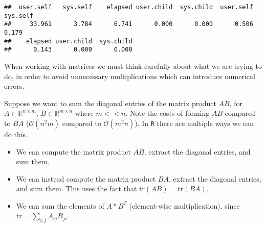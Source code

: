 \documentclass[]{article}
\newenvironment{Shaded}{\begin{snugshade}}{\end{snugshade}}
\newcommand{\CommentTok}[1]{\textcolor[rgb]{0.56,0.35,0.01}{\textit{#1}}}
\newcommand{\DecValTok}[1]{\textcolor[rgb]{0.00,0.00,0.81}{#1}}
\newcommand{\KeywordTok}[1]{\textcolor[rgb]{0.13,0.29,0.53}{\textbf{#1}}}
\newcommand{\NormalTok}[1]{#1}
\newcommand{\OperatorTok}[1]{\textcolor[rgb]{0.81,0.36,0.00}{\textbf{#1}}}
\newcommand{\StringTok}[1]{\textcolor[rgb]{0.31,0.60,0.02}{#1}}
\begin{document}
\begin{verbatim}
##  user.self   sys.self    elapsed user.child  sys.child  user.self   sys.self 
##     33.961      3.784      6.741      0.000      0.000      0.506      0.179 
##    elapsed user.child  sys.child 
##      0.143      0.000      0.000
\end{verbatim}

When working with matrices we must think carefully about what we are
trying to do, in order to avoid unnecessary multiplications which can
introduce numerical errors.

Suppose we want to sum the diagonal entries of the matrix product
\(AB\), for \(A \in \mathbb{R}^{n \times m}\),
\(B \in \mathbb{R}^{m \times n}\) where \(m << n\). Note the costs of
forming \(AB\) compared to \(BA\) (\(\mathcal{O}(n^2m)\) compared to
\(\mathcal{O}(m^2n)\)). In \texttt{R} there are multiple ways we can do
this.

\begin{itemize}
\item
  We can compute the matrix product \(AB\), extract the diagonal
  entries, and sum them.
\item
  We can instead compute the matrix product \(BA\), extract the diagonal
  entries, and sum them. This uses the fact that
  \(\text{tr}(AB) = \text{tr}(BA)\).
\item
  We can sum the elements of \(A * B^T\) (element-wise multiplication),
  since \(\text{tr} = \sum_{i,j} A_{ij} B_{ji}\).
\end{itemize}

\begin{Shaded}
\end{Shaded}
\end{document}
